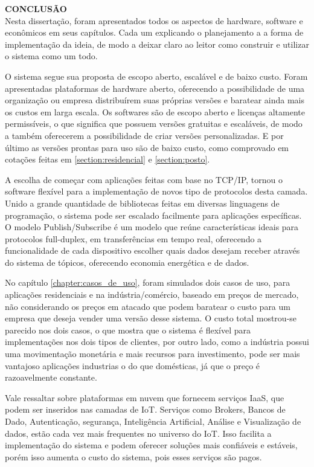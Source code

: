 \noindent\textbf{CONCLUSÃO}
$\!$\\


Nesta dissertação, foram apresentados todos os aspectos de hardware, software e econômicos em seus capítulos. Cada um explicando o planejamento a a forma de implementação da ideia, de modo a deixar claro ao leitor como construir e utilizar o sistema como um todo.

O sistema segue sua proposta de escopo aberto, escalável e de baixo custo. Foram apresentadas plataformas de hardware aberto, oferecendo a possibilidade de uma organização ou empresa distribuírem suas próprias versões e baratear ainda mais os custos em larga escala. Os softwares são de escopo aberto e licenças altamente permissíveis, o que significa que possuem versões gratuitas e escaláveis, de modo a também oferecerem a possibilidade de criar versões personalizadas. E por último as versões prontas para uso são de baixo custo, como comprovado em cotações feitas em \ref{section:residencial} e \ref{section:posto}.

A escolha de começar com aplicações feitas com base no TCP/IP, tornou o software flexível para a implementação de novos tipo de protocolos desta camada. Unido a grande quantidade de bibliotecas feitas em diversas linguagens de programação, o sistema pode ser escalado facilmente para aplicações específicas. O modelo Publish/Subscribe é um modelo que reúne características ideais para protocolos full-duplex, em transferências em tempo real, oferecendo a funcionalidade de cada dispositivo escolher quais dados desejam receber através do sistema de tópicos, oferecendo economia energética e de dados.

No capítulo \ref{chapter:casos_de_uso}, foram simulados dois casos de uso, para aplicações residenciais e na indústria/comércio, baseado em preços de mercado, não considerando os preços em atacado que podem baratear o custo para um empresa que deseja vender uma versão desse sistema. O custo total mostrou-se parecido nos dois casos, o que mostra que o sistema é flexível para implementações nos dois tipos de clientes, por outro lado, como a indústria possui uma movimentação monetária e mais recursos para investimento, pode ser mais vantajoso aplicações industrias o do que domésticas, já que o preço é razoavelmente constante.

Vale ressaltar sobre plataformas em nuvem que fornecem serviços IaaS, que podem ser inseridos nas camadas de IoT. Serviços como Brokers, Bancos de Dado, Autenticação, segurança, Inteligência Artificial, Análise e Visualização de dados, estão cada vez mais frequentes no universo do IoT. Isso facilita a implementação do sistema e podem oferecer soluções mais confiáveis e estáveis, porém isso aumenta o custo do sistema, pois esses serviços são pagos.

